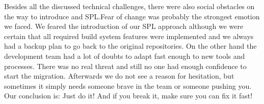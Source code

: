 Besides all the discussed technical challenges, there were also social obstacles
on the way to introduce and SPL.\@ Fear of change was probably the strongest
emotion we faced. We feared the introduction of our SPL approach although we
were certain that all required build system features were implemented and we
always had a backup plan to go back to the original repositories. On the other
hand the development team had a lot of doubts to adapt fast enough to new tools
and processes. There was no real threat and still no one had enough confidence
to start the migration. Afterwards we do not see a reason for hesitation, but
sometimes it simply needs someone brave in the team or someone pushing you. Our
conclusion is: Just do it! And if you break it, make sure you can fix it fast!
